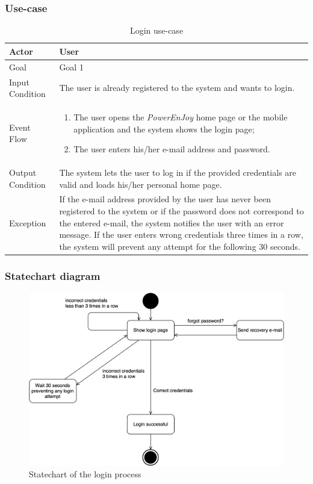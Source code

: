 \subsubsection{Use-case}
\begin{table}[!h]
\begin{center}
\begin{tabular}{p{} | p{}}
\hline
Actor & User\\
\hline
Goal & Goal 1\\
\hline
Input Condition & The user is already registered to the system and wants to login.\\
\hline
Event Flow & 
\begin{enumerate}
\item The user opens the \emph{PowerEnJoy} home page or the mobile application and the system shows the login page;
\item The user enters his/her e-mail address and password.
\end{enumerate} \\
\hline
Output Condition & The system lets the user to log in if the provided credentials are valid and loads his/her personal home page.\\
\hline
Exception & 
If the e-mail address provided by the user has never been registered to the system or if the password does not correspond to the entered e-mail, the system notifies the user with an error message. If the user enters wrong credentials three times in a row, the system will prevent any attempt for the following 30 seconds.\\
\hline
\end{tabular}
\end{center}
\caption{Login use-case}
\label{login_uc}
\end{table}

\subsubsection{Statechart diagram}
\begin{figure}[!h]
	\centering
		\includegraphics[width=\textwidth]{./specific_requirements/features/diagrams/login_statechart.png}
		\caption{Statechart of the login process}
\end{figure}

